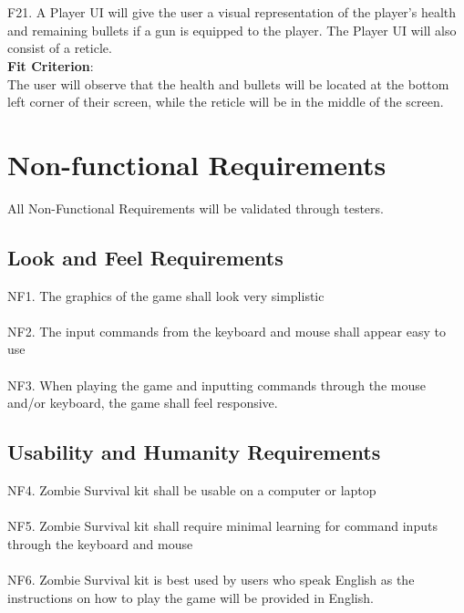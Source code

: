 \documentclass[12pt, titlepage]{article}
\begin{document}
\\\\
{\color{magenta} F21. A Player UI will give the user a visual representation of the player's health and remaining bullets if a gun is equipped to the player. The Player UI will also consist of a reticle. \\
\textbf{Fit Criterion}:\\ The user will observe that the health and bullets will be located at the bottom left corner of their screen, while the reticle will be in the middle of the screen}. 
\newpage

\section{Non-functional Requirements}
{\color{magenta} All Non-Functional Requirements will be validated through testers}. 

\subsection{Look and Feel Requirements}
{\color{magenta} NF1.} The graphics of the game shall look very simplistic
\\\\
{\color{magenta} NF2.} The input commands from the keyboard and mouse shall appear easy to use
\\\\
{\color{magenta} NF3.} When playing the game and inputting commands through the mouse and/or keyboard, the game shall feel responsive.

\subsection{Usability and Humanity Requirements}
{\color{magenta} NF4.} Zombie Survival kit shall be usable on a computer or laptop
\\\\
{\color{magenta} NF5.} Zombie Survival kit shall require minimal learning for command inputs through the keyboard and mouse
\\\\
{\color{magenta} NF6.} Zombie Survival kit is best used by users who speak English as the instructions on how to play the game will be provided in English. 
\end{document}
